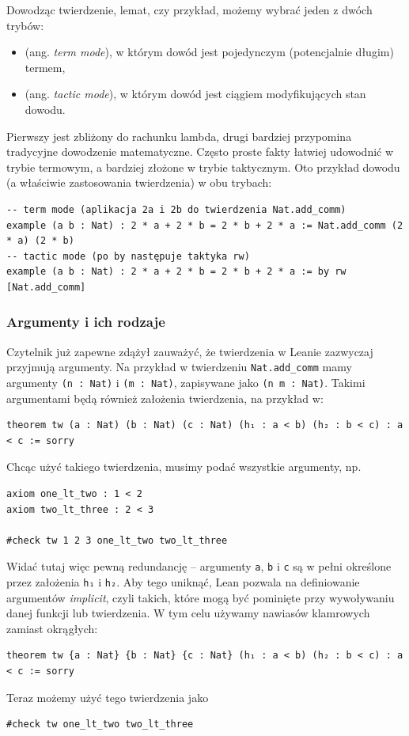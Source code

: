 \documentclass[polish,pretty,bibliography=totocnumbered]{angav}
\newcommand{\Lean}[1]{\texttt{#1}}
\begin{document}
Dowodząc twierdzenie, lemat, czy przykład, możemy wybrać jeden z dwóch trybów:
\begin{itemize}
    \item {} (ang. \textit{term mode}), w którym dowód jest pojedynczym (potencjalnie długim) termem,
    \item {} (ang. \textit{tactic mode}), w którym dowód jest ciągiem  modyfikujących stan dowodu.
\end{itemize}
Pierwszy jest zbliżony do rachunku lambda, drugi bardziej przypomina tradycyjne dowodzenie matematyczne. Często proste fakty łatwiej udowodnić w trybie termowym, a bardziej złożone w trybie taktycznym.
Oto przykład dowodu (a właściwie zastosowania twierdzenia) w obu trybach:
\begin{verbatim}
-- term mode (aplikacja 2a i 2b do twierdzenia Nat.add_comm)
example (a b : Nat) : 2 * a + 2 * b = 2 * b + 2 * a := Nat.add_comm (2 * a) (2 * b)
-- tactic mode (po by następuje taktyka rw)
example (a b : Nat) : 2 * a + 2 * b = 2 * b + 2 * a := by rw [Nat.add_comm]
\end{verbatim}

\subsubsection{Argumenty i ich rodzaje}

Czytelnik już zapewne zdążył zauważyć, że twierdzenia w Leanie zazwyczaj przyjmują argumenty. Na przykład w twierdzeniu \Lean{Nat.add_comm} mamy argumenty \Lean{(n : Nat)} i \Lean{(m : Nat)}, zapisywane jako \Lean{(n m : Nat)}.
Takimi argumentami będą również założenia twierdzenia, na przykład w:
\begin{verbatim}
theorem tw (a : Nat) (b : Nat) (c : Nat) (h₁ : a < b) (h₂ : b < c) : a < c := sorry
\end{verbatim}
Chcąc użyć takiego twierdzenia, musimy podać wszystkie argumenty, np.
\begin{verbatim}
axiom one_lt_two : 1 < 2
axiom two_lt_three : 2 < 3

#check tw 1 2 3 one_lt_two two_lt_three
\end{verbatim}

Widać tutaj więc pewną redundancję -- argumenty \Lean{a}, \Lean{b} i \Lean{c} są w pełni określone przez założenia \Lean{h₁} i \Lean{h₂}.
Aby tego uniknąć, Lean pozwala na definiowanie argumentów \textit{implicit}, czyli takich, które mogą być pominięte przy wywoływaniu danej funkcji lub twierdzenia. W tym celu używamy nawiasów klamrowych zamiast okrągłych:
\begin{verbatim}
theorem tw {a : Nat} {b : Nat} {c : Nat} (h₁ : a < b) (h₂ : b < c) : a < c := sorry
\end{verbatim}
Teraz możemy użyć tego twierdzenia jako
\begin{verbatim}
#check tw one_lt_two two_lt_three
\end{verbatim}
\end{document}
